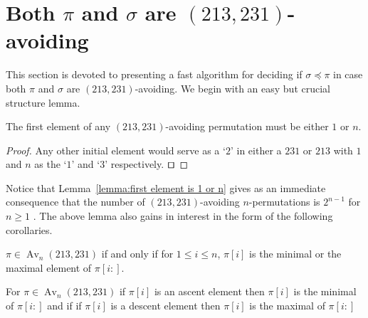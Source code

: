 \documentclass[a4paper]{llncs}
\DeclareMathOperator{\AV}{Av}
\DeclareMathOperator{\Avd}{Av}
\newcommand\Av[2]{\Avd_{{#1}}({#2})}
\DeclareMathOperator{\stripea}{s}
\newcommand{\stripe}[2]{\stripea_{{#1}}[{#2}]}
\newcounter{num}
\newcommand{\dstep}{d}
\newcommand{\ustep}{a}
\begin{document}


\section{Both $\pi$ and $\sigma$ are $(213,231)$-avoiding}
\label{section:both are (231,213)-avoiding}

This section is devoted to presenting a fast algorithm for deciding if
$\sigma \preceq \pi$
in case both $\pi$ and $\sigma$ are $(213,231)$-avoiding.
We begin with an easy but crucial structure lemma.

\begin{lemma}[Folklore]
\label{lemma:first element is 1 or n}
The first element of any $(213,231)$-avoiding permutation
must be either $1$ or $n$.
\end{lemma}

\begin{proof}
Any other initial element would serve as a `$2$' in either a
$231$ or $213$ with $1$ and $n$ as the `$1$' and `$3$' respectively.
$\qed$
\end{proof}

Notice that Lemma~\ref{lemma:first element is 1 or n} gives as an
immediate consequence that the number of $(213,231)$-avoiding $n$-permutations
is $2^{n-1}$ for $n\geq 1$ \cite{Simion:Schmidt:EJC:1985}.
The above lemma also gains in interest in the form of the following corollaries.

\begin{corollary}
\label{corollary:minmaxelement}
$\pi \in \AV_n(213,231)$ if and only if for $1 \leq i \leq n$,
$\pi[i]$ is the minimal or the maximal element of $\pi[i:]$.
\end{corollary}

\begin{corollary}
\label{corollary:max_is_ascent}
For $\pi \in \AV_n(213,231)$ if $\pi[i]$ is an ascent element then $\pi[i]$ is the minimal of $\pi[i:]$
and if if $\pi[i]$ is a descent element then $\pi[i]$ is the maximal of $\pi[i:]$
\end{corollary}

%
\end{document}
